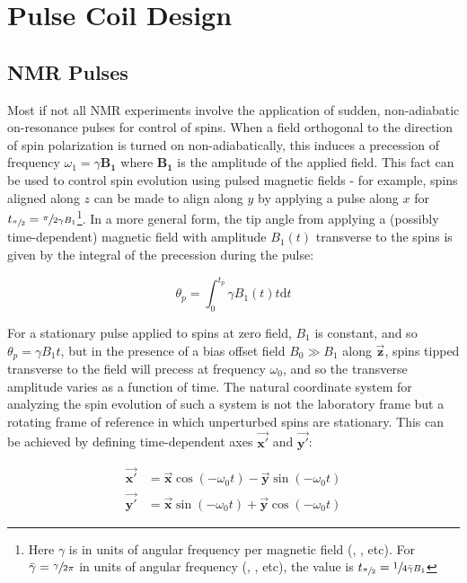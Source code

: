 \documentclass[PaulGanssle-Thesis.tex]{subfiles}
\begin{document}
\section{Pulse Coil Design}
\label{nmr.pulsecoil}
\subsection{NMR Pulses}
Most if not all NMR experiments involve the application of sudden, non-adiabatic on-resonance pulses for control of spins. When a field orthogonal to the direction of spin polarization is turned on non-adiabatically, this induces a precession of frequency $\omega_1 = \gamma\mathbf{B_1}$ where $\mathbf{B_1}$ is the amplitude of the applied field. This fact can be used to control spin evolution using pulsed magnetic fields - for example, spins aligned along $z$ can be made to align along $y$ by applying a pulse along $x$ for $t_{\sfrac{\pi}{2}} = \sfrac{\pi}{2\gamma B_1}$\footnote{Here $\gamma$ is in units of angular frequency per magnetic field (, , etc). For $\bar{\gamma} = \sfrac{\gamma}{2\pi}$ in units of angular frequency (, , etc), the value is $t_{\sfrac{\pi}{2}} = \sfrac{1}{4\bar{\gamma} B_1}$}. In a more general form, the tip angle from applying a (possibly time-dependent) magnetic field with amplitude $B_1(t)$ transverse to the spins is given by the integral of the precession during the pulse:

\begin{equation}
\label{eqn:SpinTipAngle}
\theta_p = \int_0^{t_p}\!\gamma B_1(t)t\textrm{d}t
\end{equation}

For a stationary pulse applied to spins at zero field, $B_1$ is constant, and so $\theta_p = \gamma B_1 t$, but in the presence of a bias offset field $B_0 \gg B_1$ along $\vec{\mathbf{z}}$, spins tipped transverse to the field will precess at frequency $\omega_0$, and so the transverse amplitude varies as a function of time. The natural coordinate system for analyzing the spin evolution of such a system is not the laboratory frame but a rotating frame of reference in which unperturbed spins are stationary. This can be achieved by defining time-dependent axes $\vec{\mathbf{x'}}$ and $\vec{\mathbf{y'}}$:

\begin{align}
\label{eqn:RotatingFrameXAxis}
\vec{\mathbf{x'}} & =  \vec{\mathbf{x}}\cos\left(-\omega_0 t\right) - \vec{\mathbf{y}}\sin\left(-\omega_0 t\right) \\
\label{eqn:RotatingFrameYAxis}
\vec{\mathbf{y'}} & =  \vec{\mathbf{x}}\sin\left(-\omega_0 t\right) + \vec{\mathbf{y}}\cos\left(-\omega_0 t\right)
\end{align}
\end{document}
